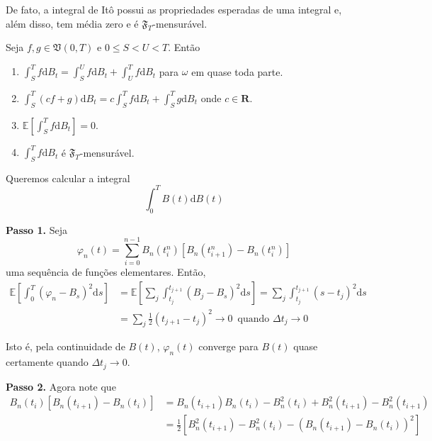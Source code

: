 \documentclass[portrait]{a0poster}	%
\theoremstyle{definition}
\begin{document}
\begin{multicols}{2}
    De fato, a integral de Itô possui as propriedades esperadas de uma integral e, além disso, tem média zero e é $\mathfrak{F}_T$-mensurável.

    \begin{theorem}[Propriedades]
        Seja $f, g \in \mathfrak{V}(0,T)$ e $0 \leq S < U < T$. Então
        \begin{enumerate}
            \item $\int_S^T f \mathrm{d}B_t = \int_S^U f \mathrm{d}B_t + \int_U^T f \mathrm{d}B_t$ para $\omega$ em quase toda parte.
            \item $\int_S^T (cf + g) \mathrm{d}B_t = c \int_S^T f \mathrm{d}B_t + \int_S^T g \mathrm{d}B_t$ onde $c \in \textbf{R}$.
            \item $\mathbb{E} \left[ \int_S^T f \mathrm{d}B_t \right] = 0$.
            \item $\int_S^T f \mathrm{d}B_t$ é $\mathfrak{F}_T$-mensurável.
        \end{enumerate}
    \end{theorem}

    \begin{example}
        Queremos calcular a integral
        \[
            \int_0^T B(t) \mathrm{d}B(t)
        \]
            
        \textbf{Passo 1.} Seja
        \[
            \varphi_n(t) = \sum_{i=0}^{n-1} B_n(t_i^n)[B_n(t_{i+1}^n) - B_n(t_i^n)]
        \]
        uma sequência de funções elementares. Então,
        \begin{equation*}
            \begin{aligned}
                \mathbb{E} \left[ \int_0^T (\varphi_n - B_s)^2 \mathrm{d}s \right]
                &= \mathbb{E} \left[ \sum_j \int_{t_j}^{t_{j+1}} (B_j - B_s)^2 \mathrm{d}s \right]
                = \sum_j \int_{t_j}^{t_{j+1}} (s - t_j)^2 \mathrm{d}s \\
                &= \sum_j \frac{1}{2} \left(t_{j+1} - t_j \right)^2 \longrightarrow 0 \, \text{ quando } \Delta t_j \to 0
            \end{aligned}
        \end{equation*}
        
        Isto é, pela continuidade de $B(t)$, $\varphi_n(t)$ converge para $B(t)$ quase certamente quando $\Delta t_j \to 0$.
        
        \textbf{Passo 2.} Agora note que
        \begin{equation*}
            \begin{aligned}
                B_n(t_i)[B_n(t_{i+1}) - B_n(t_i)] &= B_n(t_{i+1}) B_n(t_i) - B_n^2(t_i) + B_n^2(t_{i+1}) - B_n^2(t_{i+1}) \\
                &= \frac{1}{2} [B_n^2(t_{i+1}) - B_n^2(t_i) - (B_n(t_{i+1}) - B_n(t_i))^2 ]
            \end{aligned}
        \end{equation*}
        

\end{example}
\end{multicols}
\end{document}
